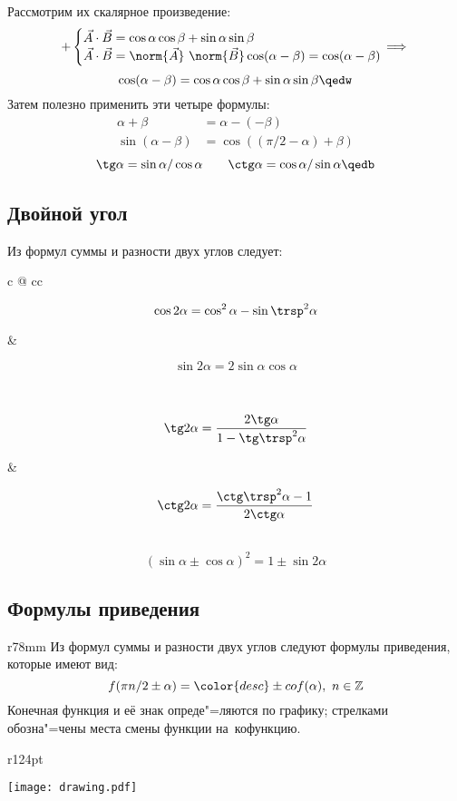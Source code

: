 Рассмотрим их скалярное произведение:
$$+\begin{cases}
\vec{A}\cdot\vec{B}=\cos\alpha\cos\beta+\sin\alpha\sin\beta\\
\vec{A}\cdot\vec{B}=\norm{\vec{A}}\ \norm{\vec{B}}\cos(\alpha-\beta)=\cos(\alpha-\beta)
\end{cases}\hspace*{-12pt}\implies$$
$$\cos(\alpha-\beta)=\cos\alpha\cos\beta+\sin\alpha\sin\beta\qedw$$
Затем полезно применить эти четыре формулы:
\begin{align*}
\alpha+\beta&=\alpha-(-\beta)\\
\sin(\alpha-\beta)&=\cos((\pi/2-\alpha)+\beta)
\end{align*}
$$\tg\alpha=\sin\alpha/\cos\alpha\quad\quad\ctg\alpha=\cos\alpha/\sin\alpha\qedb$$

\subsection{Двойной угол}

Из формул суммы и разности двух углов следует:\par
\vspace*{-6pt}
\begin{tabularc}{0pt}{0pt}{c @{\quad\quad} c}{c}
\parbox{125pt}{$$\cos 2\alpha=\cos^2\alpha-\sin\trsp^2\alpha$$} &
\parbox{114pt}{$$\sin 2\alpha=2\sin\alpha\cos\alpha$$}\\[-6pt]
\parbox{95pt}{$$\tg 2\alpha=\frac{2\tg\alpha}{1-\tg\trsp^2\alpha}$$} &
\parbox{106pt}{$$\ctg 2\alpha=\frac{\ctg\trsp^2\alpha-1}{2\ctg\alpha}$$}
\end{tabularc}\leavevmode\\[-23pt]
$$(\sin\alpha\pm\cos\alpha)^2=1\pm\sin 2\alpha$$

\subsection{Формулы приведения}

\begin{column*}{r}{78mm}
Из формул суммы и разности двух углов следуют {\ital формулы приведения}, которые
имеют вид:
$$f(\pi n/2\pm\alpha)={\color{desc}\pm co}f(\alpha),\ n\in\mathbb{Z}$$
Конечная функция и её знак опреде"=ляются по графику; стрелками обозна"=чены места
смены функции на~{\ital кофункцию}.
\end{column*}
\begin{column*}{r}{124pt}
{\centering\texttt{[image: drawing.pdf]}\par}
\end{column*}

